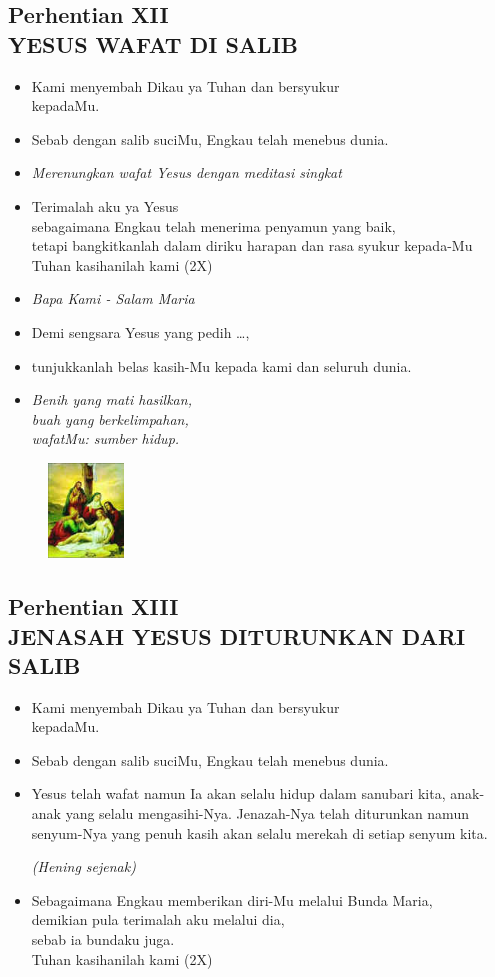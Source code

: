 \documentclass[a5paper,headsepline,titlepage,11pt,nnormalheadings,DIVcalc]{scrbook}
\newcommand{\BU}[1]{\begin{itemize} \item[U:] #1 \end{itemize}}
\newcommand{\BP}[1]{\begin{itemize} \item[P:] #1 \end{itemize}}
\newcommand{\kamiMenyembah}{\BP{ Kami menyembah Dikau ya Tuhan dan bersyukur\\kepadaMu.}
\BU{ Sebab dengan salib suciMu, Engkau telah menebus dunia.}
}
\newcommand{\kasihanilahKami}{\BP{Demi sengsara Yesus yang pedih \ldots,}
\BU{tunjukkanlah belas kasih-Mu kepada kami dan seluruh dunia.}}
\def\hening{\par \textit{(Hening sejenak)}}
\begin{document}
\subsection*{Perhentian XII\\
YESUS WAFAT DI SALIB}

\kamiMenyembah

\BP{\textit{Merenungkan wafat Yesus dengan meditasi singkat}}

\BU{Terimalah aku ya Yesus\\ sebagaimana Engkau telah menerima penyamun yang baik,\\ tetapi bangkitkanlah dalam diriku harapan dan rasa syukur kepada-Mu\\
Tuhan kasihanilah kami (2X)}

\large\begin{itemize}\item[~]\it{Bapa Kami - Salam Maria}\end{itemize}\normalsize
\kasihanilahKami

\begin{itemize}
\item[13.] \it{Benih yang mati hasilkan,\\
	buah yang berkelimpahan,\\
	wafatMu: sumber hidup.}
\end{itemize}

\begin{figure}
\includegraphics[width=2cm]{jalansalib_files/13_small.jpg}
\end{figure}
\subsection*{Perhentian XIII\\
JENASAH YESUS DITURUNKAN DARI SALIB}

\kamiMenyembah

\BP{Yesus telah wafat namun Ia akan selalu hidup dalam sanubari kita, anak-anak yang selalu mengasihi-Nya. Jenazah-Nya telah diturunkan namun senyum-Nya yang penuh kasih akan selalu merekah di setiap senyum kita.
\hening
}

\BU{Sebagaimana Engkau memberikan diri-Mu melalui Bunda Maria,\\ demikian pula terimalah aku melalui dia,\\ sebab ia bundaku juga.\\
Tuhan kasihanilah kami (2X)
}
\end{document}
